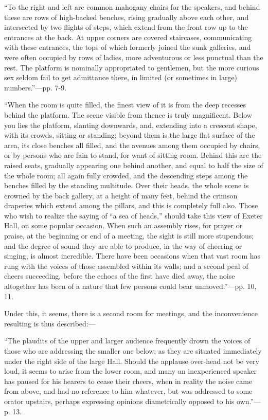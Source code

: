 ``To
the right and left are common mahogany chairs for the speakers, and
behind these are rows of high-backed benches, rising gradually above
each other, and intersected by two flights of steps, which extend from
the front row up to the entrances at the back. At upper corners are
covered staircases, communicating with these entrances, the tops of
which formerly joined the sunk galleries, and were often occupied by
rows of ladies, more adventurous or less punctual than the rest. The
platform is nominally appropriated to gentlemen, but the more curious
sex seldom fail to get admittance there, in limited (or sometimes in
large) numbers.''—pp. 7-9.

``When
the room is quite filled, the finest view of it is from the deep
recesses behind the platform. The scene visible from thence is truly
magnificent. Below you lies the platform, slanting downwards, and,
extending into a crescent shape, with its crowds, sitting or standing;
beyond them is the large flat surface of the area, its close benches all
filled, and the avenues among them occupied by chairs, or by persons who
are fain to stand, for want of sitting-room. Behind this are the raised
seats, gradually appearing one behind another, and equal to half the
size of the whole room; all again fully crowded, and the descending
steps among the benches filled by the standing multitude. Over their
heads, the whole scene is crowned by the back gallery, at a height of
many feet, behind the crimson draperies which extend among the pillars,
and this is completely full also. Those who wish to realize the saying
of ``a sea of heads,'' should take this view of Exeter Hall, on some
popular occasion. When such an assembly rises, for prayer or praise, at
the beginning or end of a meeting, the sight is still more stupendous;
and the degree of sound they are able to produce, in the way of cheering
or singing, is almost incredible. There have been occasions when that
vast room has rung with the voices of those assembled within its walls;
and a second peal of cheers succeeding, before the echoes of the first
have died away, the noise altogether has been of a nature that few
persons could bear unmoved.''—pp. 10, 11.

Under this,
it seems, there is a second room for meetings, and the inconvenience
resulting is thus described:—

``The
plaudits of the upper and larger audience frequently drown the voices of
those who are addressing the smaller one below; as they are situated
immediately under the right side of the large Hall. Should the applause
over-head not be very loud, it seems to arise from the lower
room,
and many an inexperienced speaker has paused for his hearers to cease
their cheers, when in reality the noise came from above, and had no
reference to him whatever, but was addressed to some orator upstairs,
perhaps expressing opinions diametrically opposed to his own.''—p.
13.

